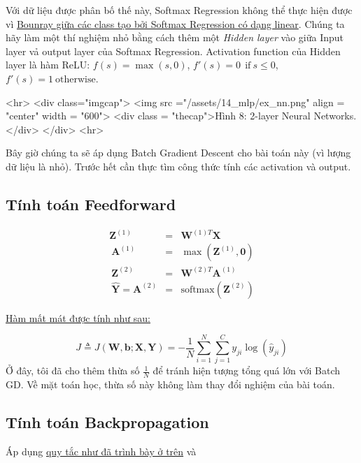 Với dữ liệu được phân bố thế này, Softmax Regression không thể thực hiện được vì \href{http://machinelearningcoban.com/2017/02/17/softmax/#-boundary-tao-boi-softmax-regression-la-linear}{Bounray giữa các class tạo bởi Softmax Regression có dạng linear}. Chúng ta hãy làm một thí nghiệm nhỏ bằng cách thêm một \textit{Hidden layer} vào giữa Input layer vả output layer của Softmax Regression. Activation function của Hidden layer là hàm ReLU: $f(s) = \max(s, 0)$, $f'(s) = 0 ~~\text{if}~ s \leq 0$, $f'(s) = 1 ~\text{otherwise}$. 
 
<hr> 
<div class="imgcap"> 
 <img src ="/assets/14_mlp/ex_nn.png" align = "center" width = "600"> 
 <div class = "thecap">Hình 8: 2-layer Neural Networks.</div> 
</div> 
<hr> 
 
Bây giờ chúng ta sẽ áp dụng Batch Gradient Descent cho bài toán này (vì lượng dữ liệu là nhỏ). Trước hết cần thực tìm công thức tính các activation và output. 
 
\subsection{Tính toán Feedforward}
\begin{equation*} 
\begin{eqnarray} 
\mathbf{Z}^{(1)} &=& \mathbf{W}^{(1)T}\mathbf{X} \\\ 
\mathbf{A}^{(1)} &=& \max(\mathbf{Z}^{(1)}, \mathbf{0}) \\\ 
\mathbf{Z}^{(2)} &=& \mathbf{W}^{(2)T}\mathbf{A}^{(1)} \\\ 
\mathbf{\hat{Y}} = \mathbf{A}^{(2)} &=& \text{softmax}(\mathbf{Z}^{(2)}) 
\end{eqnarray} 
\end{equation*} 
 
\href{http://machinelearningcoban.com/2017/02/17/softmax/#-ham-mat-mat-cho-softmax-regression}{Hàm mất mát được tính như sau:} 
 
\begin{equation*} 
J \triangleq J(\mathbf{W, b}; \mathbf{X, Y}) = -\frac{1}{N}\sum_{i = 1}^N \sum_{j = 1}^C y_{ji}\log(\hat{y}_{ji}) 
\end{equation*} 
Ở đây, tôi đã cho thêm thừa số $\frac{1}{N}$ để tránh hiện tượng tổng quá lớn với Batch GD. Về mặt toán học, thừa số này không làm thay đổi nghiệm của bài toán. 
 
 
\subsection{Tính toán Backpropagation}
Áp dụng \href{http://machinelearningcoban.com#-backpropagation-cho-batch-mini-batch-gradient-descent}{quy tắc như đã trình bày ở trên} và 
 
